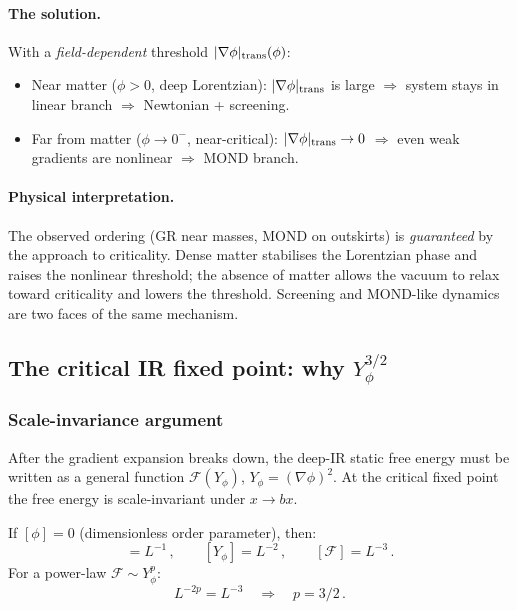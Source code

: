 \documentclass[11pt,a4paper]{article}
\numberwithin{equation}{section}
\begin{document}
\paragraph{The solution.}
With a \emph{field-dependent} threshold
$|\nabla\phi|_{\rm trans}(\phi)$:
\begin{itemize}
\item Near matter ($\phi > 0$, deep Lorentzian):
  $|\nabla\phi|_{\rm trans}$ is large $\Rightarrow$ system stays
  in linear branch $\Rightarrow$ Newtonian + screening.
\item Far from matter ($\phi \to 0^-$, near-critical):
  $|\nabla\phi|_{\rm trans} \to 0$ $\Rightarrow$ even weak
  gradients are nonlinear $\Rightarrow$ MOND branch.
\end{itemize}

\paragraph{Physical interpretation.}
The observed ordering (GR near masses, MOND on outskirts) is
\emph{guaranteed} by the approach to criticality. Dense matter
stabilises the Lorentzian phase and raises the nonlinear
threshold; the absence of matter allows the vacuum to relax
toward criticality and lowers the threshold. Screening and
MOND-like dynamics are two faces of the same mechanism.


\subsection{The critical IR fixed point: why $Y_\phi^{3/2}$}
\label{app:lof:Y32}

\subsubsection{Scale-invariance argument}

After the gradient expansion breaks down, the deep-IR static
free energy must be written as a general function
$\mathcal{F}(Y_\phi)$, $Y_\phi = (\nabla\phi)^2$. At the
critical fixed point the free energy is scale-invariant under
$x \to bx$.

If $[\phi] = 0$ (dimensionless order parameter), then:
\begin{equation}
[\nabla\phi] = L^{-1}\,,
\qquad [Y_\phi] = L^{-2}\,,
\qquad [\mathcal{F}] = L^{-3}\,.
\end{equation}
For a power-law $\mathcal{F} \sim Y_\phi^p$:
\begin{equation}
L^{-2p} = L^{-3}
\quad\Longrightarrow\quad
\boxed{p = 3/2\,.}
\end{equation}
\end{document}
